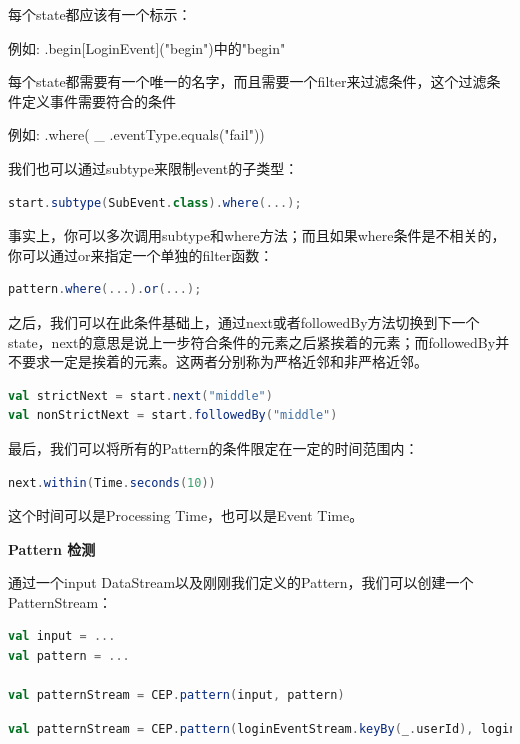 \documentclass[oneside]{ctexbook}
\begin{document}
每个state都应该有一个标示：

例如: .begin[LoginEvent]("begin")中的"begin"

每个state都需要有一个唯一的名字，而且需要一个filter来过滤条件，这个过滤条件定义事件需要符合的条件

例如: \colorbox{gray!20}{.where( \_ .eventType.equals("fail"))}

我们也可以通过subtype来限制event的子类型：

\begin{lstlisting}[language=scala]
start.subtype(SubEvent.class).where(...);
\end{lstlisting}

事实上，你可以多次调用subtype和where方法；而且如果where条件是不相关的，你可以通过or来指定一个单独的filter函数：

\begin{lstlisting}[language=scala]
pattern.where(...).or(...);
\end{lstlisting}

之后，我们可以在此条件基础上，通过next或者followedBy方法切换到下一个state，next的意思是说上一步符合条件的元素之后紧挨着的元素；而followedBy并不要求一定是挨着的元素。这两者分别称为严格近邻和非严格近邻。

\begin{lstlisting}[language=scala]
val strictNext = start.next("middle")
val nonStrictNext = start.followedBy("middle")
\end{lstlisting}

最后，我们可以将所有的Pattern的条件限定在一定的时间范围内：

\begin{lstlisting}[language=scala]
next.within(Time.seconds(10))
\end{lstlisting}

这个时间可以是Processing Time，也可以是Event Time。

\textbf{Pattern 检测}

通过一个input DataStream以及刚刚我们定义的Pattern，我们可以创建一个PatternStream：

\begin{lstlisting}[language=scala]
val input = ...
val pattern = ...

val patternStream = CEP.pattern(input, pattern)
\end{lstlisting}

\begin{lstlisting}[language=scala]
val patternStream = CEP.pattern(loginEventStream.keyBy(_.userId), loginFailPattern)
\end{lstlisting}
\end{document}
